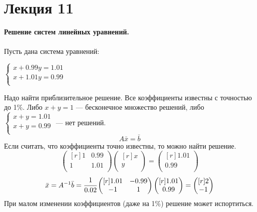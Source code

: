 \documentclass[12pt]{article}
\theoremstyle{definition}
\numberwithin{equation}{section}
\begin{document}
	\section *{Лекция 11}
	\noindent\textbf{Решение систем линейных уравнений.}\\ \\
	Пусть дана система уравнений:\begin{center}
		$
		\left\{
		\begin{array}{lcl}
		x+0.99y=1.01 \\
		x+1.01y=0.99 \\
		\end{array}
		\right.
		$
	\end{center}
	Надо найти приблизительное решение. Все коэффициенты известны с точностью до 1\%.
	Либо $x+y=1$ --- бесконечное множество решений, либо 
	$
	\left\{
	\begin{array}{lcl}
	x+y=1.01 \\
	x+y=0.99 \\
	\end{array}
	\right.
	$
	--- нет решений.\\
	$$A\bar x=\bar b$$
	Если считать, что коэффициенты точно известны, то можно найти решение.
	\[\begin{pmatrix}[r]
	1 & 0.99 \\
	1 & 1.01 \\
	\end{pmatrix} \begin{pmatrix}[r]
	x \\
	y \\
	\end{pmatrix} = \begin{pmatrix}[r]
	1.01 \\
	0.99 \\
	\end{pmatrix}\]
	\[\bar x= A^{-1} \bar b = \cfrac{1}{0.02} \begin{pmatrix}[r]
	1.01 & -0.99 \\
	-1 & 1 \\
	\end{pmatrix} \begin{pmatrix}[r]
	1.01 \\
	0.99 \\
	\end{pmatrix} = \begin{pmatrix}[r]
	2 \\
	-1 \\
	\end{pmatrix}\]
	При малом изменении коэффициентов (даже на 1\%) решение может испортиться.\\ \\
\end{document}
